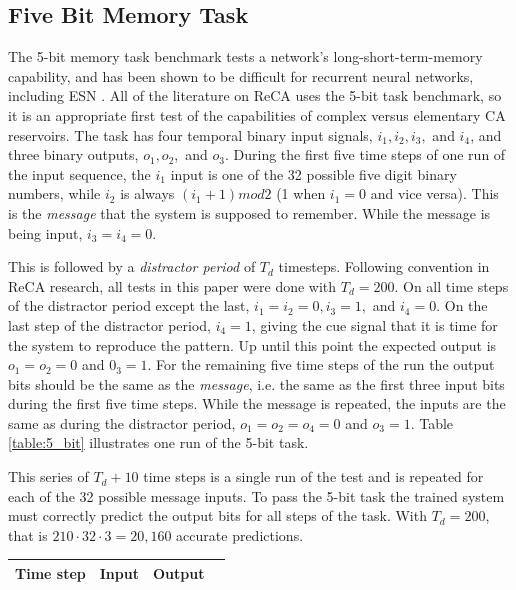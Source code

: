 \documentclass{elsarticle}
\begin{document}
\begin{multicols}{2}
	\subsection{Five Bit Memory Task}\label{5_bit}
	The 5-bit memory task benchmark tests a network's long-short-term-memory 
	capability, and has been shown to be difficult for recurrent neural networks, 
	including ESN \cite{hochreiter1997long}\cite{jaeger2012long}. All of the 
	literature on ReCA uses the 5-bit task benchmark, so it is an appropriate 
	first test of the capabilities of complex versus elementary CA reservoirs.  
	The task has four temporal binary input signals, $i_1, i_2, i_3,$ and 
	$i_4$, and three binary outputs, $o_1, o_2,$ and $o_3$.  During the
	first five time steps of one run of the input sequence, the $i_1$ input is one 
	of the 32 possible five digit binary numbers, while $i_2$ is always $(i_1 + 1) 
	mod 2$ (1 when $i_1 = 0$ and vice versa). This is the \textit{message} that 
	the system is supposed to remember. While the message is being input, $i_3 
	= i_4 = 0$.  \par  This is followed by a \textit{distractor period} of 
	$T_d$ timesteps.  Following convention in ReCA research, all tests in this 
	paper were done with $T_d = 200$.  On all time steps of the distractor 
	period except the last, $i_1 = i_2 = 0, i_3 = 1, $ and $i_4 = 0$. On the 
	last step of the distractor period, $i_4 = 1$, giving the cue signal that 
	it is time for the system to reproduce the pattern. Up until this point the 
	expected output is $o_1 = o_2 = 0 $ and $0_3 = 1$. For the remaining five 
	time steps of the run the output bits should be the same as the 
	\textit{message}, i.e.  the same as the first three input bits during the 
	first five time steps.  While the message is repeated, the inputs are the 
	same as during the distractor period, $o_1 = o_2 = o_4 = 0$ and $o_3 = 1$.  
	Table \ref{table:5_bit} illustrates one run of the 5-bit task. \par
	This series of $T_d + 10$ time steps is a single run of the test and is 
	repeated for each of the 32 possible message inputs. To pass the 5-bit task 
	the trained system must correctly predict the output bits for all steps of 
	the task. With $T_d = 200$, that is $210 \cdot 32 \cdot 3 = 20,160$ accurate 
	predictions.
	
        \begin{table}[t]  \centering
		\small
		\begin{tabular}{|c|l|l|l|l|l|l|l|l}
			\cline{1-8}
			\multicolumn{1}{|l|}{Time step} & \multicolumn{4}{l|}{Input} & \multicolumn{3}{l|}{Output} & \cellcolor[HTML]{FFFFFF}{\color[HTML]{333333} } \\ \hline
			

\end{tabular}
\end{table}
\end{multicols}
\end{document}

